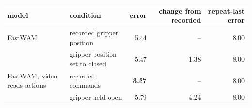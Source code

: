 \begin{tabular}{llrrr}
\toprule
model & condition & error & change from recorded & repeat-last error \\
\midrule
FastWAM & recorded gripper position & 5.44 & -- & 8.00 \\
 & gripper position set to closed & 5.47 & 1.38 & 8.00 \\
\midrule
FastWAM, video reads actions & recorded commands & \textbf{3.37} & -- & 8.00 \\
 & gripper held open & 5.79 & 4.24 & 8.00 \\
\bottomrule
\end{tabular}

